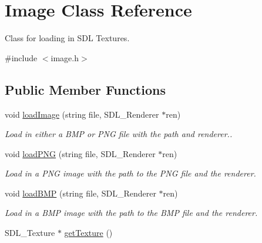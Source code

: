 \hypertarget{classImage}{}\section{Image Class Reference}
\label{classImage}


Class for loading in S\+DL Textures.  




{\ttfamily \#include $<$image.\+h$>$}

\subsection*{Public Member Functions}
\begin{DoxyCompactItemize}
\item 
void \hyperlink{classImage_a776ab55f3884f994512aa092cd7fa250}{load\+Image} (string file, S\+D\+L\+\_\+\+Renderer $\ast$ren)\hypertarget{classImage_a776ab55f3884f994512aa092cd7fa250}{}\label{classImage_a776ab55f3884f994512aa092cd7fa250}

\begin{DoxyCompactList}\small\item\em Load in either a B\+MP or P\+NG file with the path and renderer.. \end{DoxyCompactList}\item 
void \hyperlink{classImage_ab00c4a53e3154287075c956c805e1cb1}{load\+P\+NG} (string file, S\+D\+L\+\_\+\+Renderer $\ast$ren)\hypertarget{classImage_ab00c4a53e3154287075c956c805e1cb1}{}\label{classImage_ab00c4a53e3154287075c956c805e1cb1}

\begin{DoxyCompactList}\small\item\em Load in a P\+NG image with the path to the P\+NG file and the renderer. \end{DoxyCompactList}\item 
void \hyperlink{classImage_ad37ad8bd7d9572be7fbbd921a299d235}{load\+B\+MP} (string file, S\+D\+L\+\_\+\+Renderer $\ast$ren)\hypertarget{classImage_ad37ad8bd7d9572be7fbbd921a299d235}{}\label{classImage_ad37ad8bd7d9572be7fbbd921a299d235}

\begin{DoxyCompactList}\small\item\em Load in a B\+MP image with the path to the B\+MP file and the renderer. \end{DoxyCompactList}\item 
S\+D\+L\+\_\+\+Texture $\ast$ \hyperlink{classImage_a6312e473b9315c6db49fbd284b5cf81a}{get\+Texture} ()\hypertarget{classImage_a6312e473b9315c6db49fbd284b5cf81a}{}\label{classImage_a6312e473b9315c6db49fbd284b5cf81a}


\end{DoxyCompactItemize}
